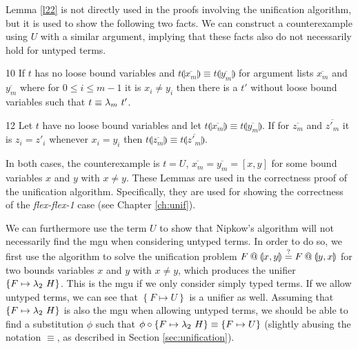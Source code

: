 Lemma \ref{l22} is not directly used in the proofs involving the unification algorithm, but it is used to show the following two facts. We can construct a counterexample using $U$ with a similar argument, implying that these facts also do not necessarily hold for untyped terms.

\begin{fact}{10}
	\label{f10}
	If $t$ has no loose bound variables and $t \llparenthesis \overline{x_m} \rrparenthesis \equiv t \llparenthesis \overline{y_m} \rrparenthesis$ for argument lists $\overline{x_m}$ and $\overline{y_m}$ where for $0 \leq i \leq m - 1$ it is $x_i \neq y_i$ then there is a $t'$ without loose bound variables such that $t \equiv \lambda_{m} \ t'$.
\end{fact}

\begin{fact}{12}
	\label{f12}
	Let $t$ have no loose bound variables and let $t \llparenthesis \overline{x_m} \rrparenthesis \equiv t \llparenthesis \overline{y_m} \rrparenthesis$. If for $\overline{z_m}$ and $\overline{z'_m}$ it is $z_i = z'_i$ whenever $x_i = y_i$ then $t \llparenthesis \overline{z_m} \rrparenthesis \equiv t \llparenthesis \overline{z'_m} \rrparenthesis$.
\end{fact}

In both cases, the counterexample is $t = U$, $\overline{x_m} = \overline{y_m} = \left[ x, y \right]$ for some bound variables $x$ and $y$ with $x \neq y$. These Lemmas are used in the correctness proof of the unification algorithm. Specifically, they are used for showing the correctness of the \textit{flex-flex-1} case (see Chapter \ref{ch:unif}).

We can furthermore use the term $U$ to show that Nipkow's algorithm \cite{Nipkow-LICS-93} will not necessarily find the mgu when considering untyped terms. In order to do so, we first use the algorithm to solve the unification problem $F \mathbin{@} \llparenthesis x, y \rrparenthesis \overset{?}{=} F \mathbin{@} \llparenthesis y, x \rrparenthesis$ for two bounds variables $x$ and $y$ with $x \neq y$, which produces the unifier $\left\{ F \mapsto \lambda_{2} \ H \right\}$. This is the mgu if we only consider simply typed terms. If we allow untyped terms, we can see that $\left\{ F \mapsto U \right\}$ is a unifier as well. Assuming that $\left\{ F \mapsto \lambda_{2} \ H \right\}$ is also the mgu when allowing untyped terms, we should be able to find a substitution $\phi$ such that $\phi \circ \left\{ F \mapsto \lambda_{2} \ H \right\} \equiv \left\{ F \mapsto U \right\}$ (slightly abusing the notation $\equiv$, as described in Section \ref{sec:unification}).

